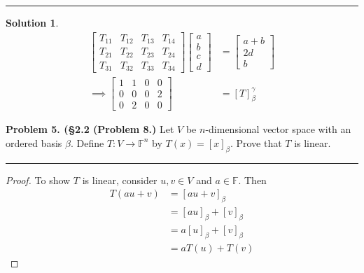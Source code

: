 \documentclass[leqno]{article}
\theoremstyle{nonumberplain}
\newtheorem{proof}{Proof}
\newtheorem{solution}{Solution}
\begin{document}
\noindent\rule[0.5ex]{\linewidth}{1pt}

\begin{solution}
\begin{align*}
\begin{bmatrix}
T_{11} & T_{12} & T_{13} & T_{14}\\
T_{21} & T_{22} & T_{23} & T_{24}\\
T_{31} & T_{32} & T_{33} & T_{34}
\end{bmatrix}
\begin{bmatrix}
a\\
b\\
c\\
d
\end{bmatrix}
&=
\begin{bmatrix}
a+b\\
2d\\
b
\end{bmatrix}\\
\implies 
\begin{bmatrix}
1 & 1 & 0 & 0 \\
0 & 0 & 0 & 2 \\
0 & 2 & 0 & 0
\end{bmatrix}
&=[T]_\beta^\gamma
\end{align*}
\end{solution}

\pagebreak




\noindent\textbf{Problem 5. (\S 2.2 (Problem 8.)} Let $V$ be $n$-dimensional vector space with an ordered basis $\beta$. Define $T\colon V\to \mathbb{F}^n$ by $T(x)=[x]_\beta$. Prove that $T$ is linear.

\noindent\rule[0.5ex]{\linewidth}{1pt}

\begin{proof}
To show $T$ is linear, consider $u,v\in V$ and $a \in \mathbb{F}$.  Then
\begin{align*}
T(au+v)&=[au+v]_\beta\\
&=[au]_\beta+[v]_\beta\\
&=a[u]_\beta +[v]_\beta\\
&=aT(u)+T(v)
\end{align*}
\end{proof}
\end{document}

